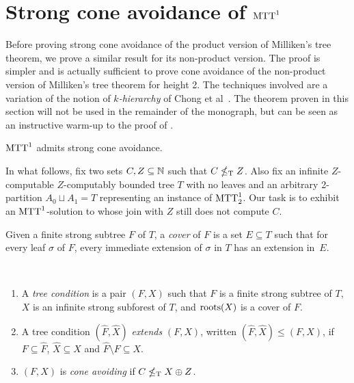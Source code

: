 \section{Strong cone avoidance of $\mathrm{MTT}^{1}_{}$}\label{sec:sca_mt1}

Before proving strong cone avoidance of the product version of Milliken's tree theorem,
we prove a similar result for its non-product version. The proof is simpler and is actually sufficient to prove cone avoidance of the non-product version of Milliken's tree theorem for height 2. The techniques involved are a variation of the notion of \emph{$k$-hierarchy} of Chong et al~\cite[Section 4]{Chong2019Strengthb}. The theorem proven in this section will not be used in the remainder of the monograph, but can be seen as an instructive warm-up to the proof of .


\begin{theorem}\label{thm:mtt1-strong-cone-avoidance}
  $\mathrm{MTT}^{1}_{}$ admits strong cone avoidance.
\end{theorem}

In what follows, fix two sets $C,Z \subseteq \mathbb{N}$ such that $C \nleq_{\text{\upshape T}} Z$. Also fix an infinite $Z$-computable $Z$-computably bounded tree $T$ with no leaves and an arbitrary 2-partition $A_0 \sqcup A_1 = T$ representing an instance of $\mathrm{MTT}^{1}_{2}$. Our task is to exhibit an $\mathrm{MTT}^{1}_{}$-solution to whose join with $Z$ still does not compute $C$.


Given a finite strong subtree $F$ of
$T$,
a \emph{cover} of $F$ is a set $E \subseteq T$ such that
for every leaf $\sigma$ of $F$, every immediate extension of $\sigma$ in $T$
has an extension in~$E$.

\begin{definition}
\
\begin{enumerate}
	\item A \emph{tree condition} is a pair $(F, X)$ such that $F$ is a finite strong subtree of $T$, $X$ is an infinite strong subforest of $T$, and $\operatorname{roots}(X)$ is a cover of $F$.
	\item A tree condition $(\hat{F}, \hat{X})$ \emph{extends} $(F, X)$, written $(\hat{F}, \hat{X}) \leq (F, X)$, if $F \subseteq \hat{F}$, $\hat{X} \subseteq X$ and $\hat{F} \setminus F \subseteq X$.
	\item $(F,X)$ is \emph{cone avoiding} if $C \nleq_{\text{\upshape T}} X \oplus Z$.
\end{enumerate}
\end{definition}

